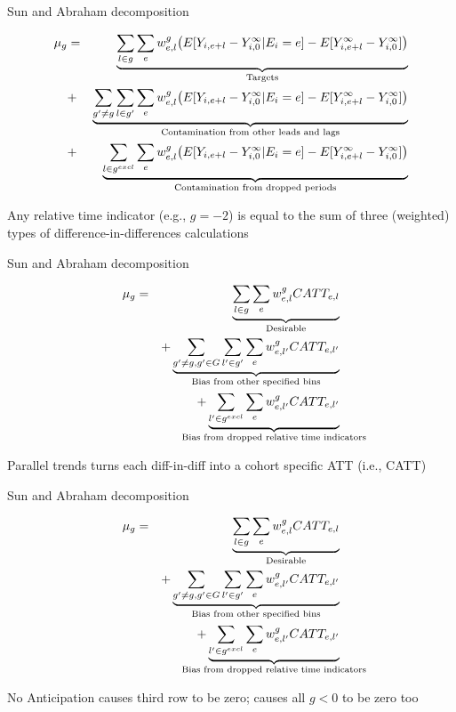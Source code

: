 \documentclass{beamer}
\begin{document}
\begin{frame}{Sun and Abraham decomposition}

\begin{eqnarray*}
\mu_g &=& \underbrace{\sum_{l \in g} \sum_{e} w^g_{e,l} \big ( E[Y_{i,e+l} - Y^{\infty}_{i,0} | E_i = e] - E[Y^{\infty}_{i,e+l} - Y^{\infty}_{i,0}] \big )}_{\mathclap{\text{Targets}}} \\
&+& \underbrace{\sum_{g' \neq g} \sum_{l \in g'} \sum_e w^g_{e,l} \big ( E[Y_{i,e+l} - Y^{\infty}_{i,0} | E_i=e] - E[Y^{\infty}_{i,e+l} - Y^{\infty}_{i,0}] \big )}_{\mathclap{\text{Contamination from other leads and lags}}} \\
&+&  \underbrace{\sum_{l \in g^{excl}} \sum_{e} w^g_{e,l} \big ( E[Y_{i,e+l} - Y^{\infty}_{i,0} | E_i=e] - E[Y^{\infty}_{i,e+l} - Y^{\infty}_{i,0}] \big )}_{\mathclap{\text{Contamination from dropped periods}}} 
\end{eqnarray*}

Any relative time indicator (e.g., $g=-2$) is equal to the sum of three (weighted) types of difference-in-differences calculations
\end{frame}


\begin{frame}{Sun and Abraham decomposition}

\begin{eqnarray*}
\mu_g &=& \underbrace{\sum_{l \in g} \sum_e w^g_{e,l} CATT_{e,l}}_{\mathclap{\text{Desirable}}} \\
&& + \underbrace{\sum_{g' \neq g, g' \in G} \sum_{l' \in g'} \sum_e w^g_{e,l'}  CATT_{e,l'}}_{\mathclap{\text{Bias from other specified bins}}} \\
&&+ \underbrace{\sum_{l' \in g^{excl}} \sum_e w^g_{e,l'} CATT_{e,l'}}_{\mathclap{\text{Bias from dropped relative time indicators}}}
\end{eqnarray*}

Parallel trends turns each diff-in-diff into a cohort specific ATT (i.e., CATT)

\end{frame}

\begin{frame}{Sun and Abraham decomposition}

\begin{eqnarray*}
\mu_g &=& \underbrace{\sum_{l \in g} \sum_e w^g_{e,l} CATT_{e,l}}_{\mathclap{\text{Desirable}}} \\
&& + \underbrace{\sum_{g' \neq g, g' \in G} \sum_{l' \in g'} \sum_e w^g_{e,l'}  CATT_{e,l'}}_{\mathclap{\text{Bias from other specified bins}}} \\
&&+ \underbrace{\sum_{l' \in g^{excl}} \sum_e w^g_{e,l'} CATT_{e,l'}}_{\mathclap{\text{Bias from dropped relative time indicators}}}
\end{eqnarray*}

No Anticipation causes third row to be zero; causes all $g<0$ to be zero too

\end{frame}
\end{document}
